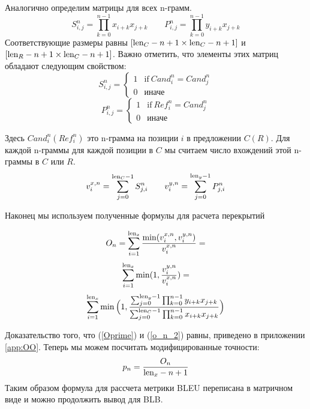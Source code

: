 \documentclass[14pt, a4paper]{extarticle}
\begin{document}
Аналогично определим матрицы для всех n-грамм.
\begin{equation}
S^{ n}_{i, j} = \prod\limits_{k=0}^{n-1}x_{i + k} x_{j + k}
\qquad
P^{ n}_{i, j} = \prod\limits_{k=0}^{n-1}y_{i + k} x_{j + k}
\end{equation}
Соответствующие размеры равны
$\lbrack \textnormal{len$_C$} - n + 1 \times \textnormal{len$_C$} - n + 1 \rbrack$
и $\lbrack \textnormal{len$_R$} - n + 1 \times \textnormal{len$_C$} - n + 1 \rbrack$.
Важно отметить, что элементы этих матриц обладают следующим свойством:
\begin{equation}
 S^{ n}_{i, j}=
  \begin{cases}
    1 & \text{if}\ Cand_i^n = Cand_j^n \\
    0 & \textrm{иначе}
  \end{cases}
\end{equation}
\begin{equation}
P^{ n}_{i, j}=
 \begin{cases}
   1 & \text{if}\ Ref_i^n = Cand_j^n \\
   0 & \textrm{иначе}
 \end{cases}
\end{equation}

Здесь $Cand_i^n(Ref_i^n)$ это n-грамма на позиции $i$ в предложении $C(R)$.
Для каждой n-граммы для каждой позиции в $C$ мы считаем число вхождений этой n-граммы
в $C$ или $R$.
\begin{equation}
v^{x, n}_{i} =  \sum\limits_{j=0}^{\textnormal{len$_C$} - 1} S^{n}_{j, i}
\qquad
v^{y, n}_{i} = \sum\limits_{j=0}^{\textnormal{len$_y$} - 1} P^{n}_{j, i}
\end{equation}

Наконец мы используем полученные формулы для расчета перекрытий

\begin{equation}
  O_n =
  \sum\limits_{i = 1}^{\textnormal{len}_x} \frac{\min(v^{x, n}_i, v^{y, n}_i)}{v^{x, n}_i} =
\label{o_n_2}
\end{equation}
$$ \sum\limits_{i = 1}^{\textnormal{len}_x} \min(1, \frac{v^{y, n}_i}{v^{x, n}_i}) = $$
\begin{equation}
  \sum\limits_{i = 1}^{\textnormal{len}_x} \min \Big(1,
  \frac{\sum_{j=0}^{\textnormal{len$_y$} - 1} \prod_{k=0}^{n-1}y_{i + k} x_{j + k}}{\sum_{j=0}^{\textnormal{len$_C$} - 1} \prod_{k=0}^{n-1}x_{i + k} x_{j + k}}\Big)
\end{equation}

Доказательство того, что (\ref{Oprime}) и (\ref{o_n_2}) равны, приведено в  приложении \ref{app:OO}.
Теперь мы можем посчитать модифицированные точности:
\begin{equation}
p_n = \frac{O_n}{\textnormal{len}_x - n + 1}
\label{p_n_2}
\end{equation}
Таким образом формула для рассчета метрики BLEU переписана в матричном виде и можно продолжить вывод для BLB.
\end{document}
